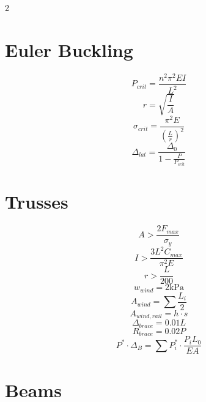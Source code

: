 \documentclass[14pt]{article}
\begin{document}
\begin{multicols}{2}
    \section{Euler Buckling}
    \begin{equation}
        P_{crit}=\frac{n^2 \pi^2 EI}{L^2}
    \end{equation}
    \begin{equation}
        r=\sqrt{\frac{I}{A}}
    \end{equation}
    \begin{equation}
        \sigma_{crit}=\frac{\pi^2 E}{\left(\frac{L}{r}\right)^2}
    \end{equation}
    \begin{equation}
        \Delta_{lat}=\frac{\Delta_0}{1-{\frac{P}{P_{crit}}}}
    \end{equation}
    \section{Trusses}
    \begin{equation}
        A>\frac{2F_{max}}{\sigma_y}
    \end{equation}
    \begin{equation}
        I>\frac{3L^2C_{max}}{\pi^2 E}
    \end{equation}
    \begin{equation}
        r>\frac{L}{200}
    \end{equation}
    \begin{equation}
        w_{wind}=2\text{kPa}
    \end{equation}
    \begin{equation}
        A_{wind}=\sum \frac{L_i}{2}
    \end{equation}
    \begin{equation}
        A_{wind, rail} = h\cdot s
    \end{equation}
    \begin{equation}
        \Delta_{brace} = 0.01L
    \end{equation}
    \begin{equation}
        R_{brace}= 0.02P
    \end{equation}
    \begin{equation}
        P^* \cdot \Delta_B=\sum P^*_i \cdot \frac{P_iL_0}{EA}
    \end{equation}
    \section{Beams}

\end{multicols}
\end{document}
